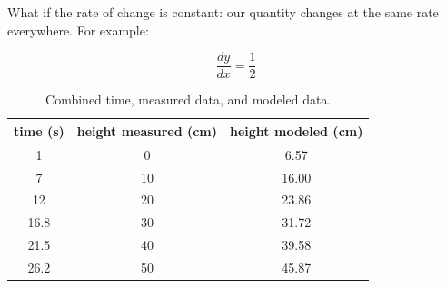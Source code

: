 \documentclass[11pt,fleqn]{book}
\begin{document}
	What if the rate of change is constant: our quantity changes at the same rate everywhere. For example:
	
	\begin{equation}
		\frac{dy}{dx} = \frac{1}{2}
	\end{equation}


	\begin{table}[h!]
		\label{table:filling_data}
		\centering
		\begin{tabular}{||c | c | c||} 
			\hline
			time (s) & height measured (cm) & height modeled (cm)\\ [0.5ex] 
			\hline\hline
			1	& 0 & 6.57 \\
			7	& 10 & 16.00 \\
			12	& 20 & 23.86 \\
			16.8	& 30 & 31.72 \\
			21.5	& 40 & 39.58 \\
			26.2	& 50 & 45.87 \\ [1ex] 
			\hline
		\end{tabular}
		\caption{Combined time, measured data, and modeled data.}
	\end{table}

	

 
\end{document}
